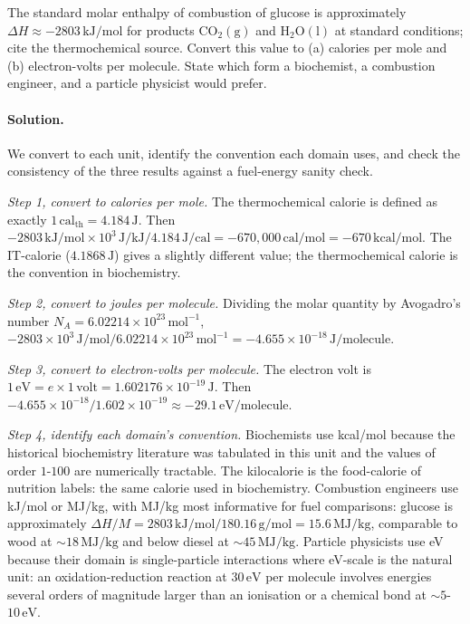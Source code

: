 \begin{exercise}
The standard molar enthalpy of combustion of glucose is approximately
$\Delta H \approx -2803 \,\si{\kilo\joule\per\mole}$ for products
$\mathrm{CO_2(g)}$ and $\mathrm{H_2O(l)}$ at standard conditions;
cite the thermochemical source. Convert this value to (a) calories
per mole and (b) electron-volts per molecule. State which form a
biochemist, a combustion engineer, and a particle physicist would
prefer.

\paragraph{Solution.}
We convert to each unit, identify the convention each domain uses,
and check the consistency of the three results against a fuel-energy
sanity check.

\textit{Step 1, convert to calories per mole.} The thermochemical
calorie is defined as exactly $1 \,\text{cal}_{\text{th}} = 4.184
\,\si{\joule}$. Then
$-2803 \,\si{\kilo\joule\per\mole} \times 10^{3} \,\si{\joule}/\si{
\kilo\joule} / 4.184 \,\si{\joule}/\text{cal} = -670{,}000 \,\text{cal}/
\text{mol} = -670 \,\text{kcal}/\text{mol}$.
The IT-calorie ($4.1868 \,\si{\joule}$) gives a slightly different
value; the thermochemical calorie is the convention in
biochemistry.

\textit{Step 2, convert to joules per molecule.} Dividing the molar
quantity by Avogadro's number $N_{A} = 6.02214 \times 10^{23}
\,\text{mol}^{-1}$,
$-2803 \times 10^{3} \,\si{\joule\per\mole} / 6.02214 \times 10^{23}
\,\text{mol}^{-1} = -4.655 \times 10^{-18} \,\si{\joule}/\text{molecule}$.

\textit{Step 3, convert to electron-volts per molecule.} The electron
volt is $1 \,\text{eV} = e \times 1 \,\text{volt} = 1.602176 \times
10^{-19} \,\si{\joule}$. Then
$-4.655 \times 10^{-18} / 1.602 \times 10^{-19} \approx -29.1
\,\text{eV}/\text{molecule}$.

\textit{Step 4, identify each domain's convention.} Biochemists use
kcal/mol because the historical biochemistry literature was tabulated
in this unit and the values of order $1$-$100$ are numerically
tractable. The kilocalorie is the food-calorie of nutrition labels:
the same calorie used in biochemistry. Combustion engineers use
kJ/mol or MJ/kg, with MJ/kg most informative for fuel comparisons:
glucose is approximately $\Delta H / M = 2803 \,\si{\kilo\joule\per
\mole} / 180.16 \,\si{\gram\per\mole} = 15.6 \,\si{\mega\joule\per
\kilogram}$, comparable to wood at $\sim 18 \,\si{\mega\joule\per
\kilogram}$ and below diesel at $\sim 45 \,\si{\mega\joule\per
\kilogram}$. Particle physicists use eV because their domain is
single-particle interactions where eV-scale is the natural unit: an
oxidation-reduction reaction at $30 \,\text{eV}$ per molecule
involves energies several orders of magnitude larger than an
ionisation or a chemical bond at $\sim 5$-$10 \,\text{eV}$.


\end{exercise}
